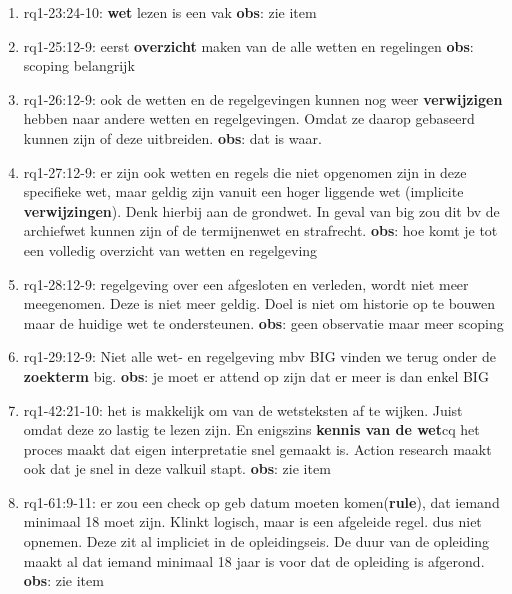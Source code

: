 \begin{enumerate}
    \item rq1-23:24-10: \textbf{wet} lezen is een vak 
    \newline\textbf{obs}: zie item
    
    \item rq1-25:12-9: eerst \textbf{overzicht} maken van de alle wetten en regelingen
    \newline\textbf{obs}: scoping belangrijk
    
    \item rq1-26:12-9: ook de wetten en de regelgevingen kunnen nog weer \textbf{verwijzigen} hebben naar andere wetten en regelgevingen. Omdat ze daarop gebaseerd kunnen zijn of deze uitbreiden.
    \newline\textbf{obs}: dat is waar.
    
    \item rq1-27:12-9: er zijn ook wetten en regels die niet opgenomen zijn in deze specifieke wet, maar geldig zijn vanuit een hoger liggende wet (implicite \textbf{verwijzingen}). 
    Denk hierbij aan de grondwet. 
    In geval van big zou dit bv de archiefwet kunnen zijn of de termijnenwet en strafrecht.
    \newline\textbf{obs}: hoe komt je tot een volledig overzicht van wetten en regelgeving
    
    \item rq1-28:12-9: regelgeving over een afgesloten en verleden, wordt niet meer meegenomen. 
    Deze is niet meer geldig. 
    Doel is niet om historie op te bouwen maar de huidige wet te ondersteunen.
    \newline\textbf{obs}: geen observatie maar meer scoping
    
    \item rq1-29:12-9: Niet alle wet- en regelgeving mbv BIG vinden we terug onder de \textbf{zoekterm} big.
    \newline\textbf{obs}: je moet er attend op zijn dat er meer is dan enkel BIG
    
    \item rq1-42:21-10: het is makkelijk om van de wetsteksten af te wijken. 
    Juist omdat deze zo lastig te lezen zijn. 
    En enigszins \textbf{kennis van de wet}cq het proces maakt dat eigen interpretatie snel gemaakt is. 
    Action research maakt ook dat je snel in deze valkuil stapt.
    \newline\textbf{obs}: zie item
    
    \item rq1-61:9-11: er zou een check op geb datum moeten komen(\textbf{rule}), dat iemand minimaal 18 moet zijn. 
    Klinkt logisch, maar is een afgeleide regel. 
    dus niet opnemen. 
    Deze zit al impliciet in de opleidingseis. 
    De duur van de opleiding maakt al dat iemand minimaal 18 jaar is voor dat de opleiding is afgerond.
    \newline\textbf{obs}: zie item
    

\end{enumerate}
